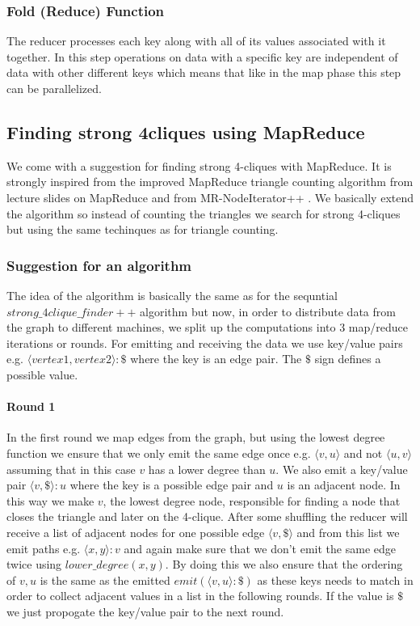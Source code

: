 \documentclass{article}
\begin{document}
\subsubsection{Fold (Reduce) Function}
The reducer processes each key along with all of its values associated with it together. In this step operations on data with a specific key are independent of data with other different keys which means that like in the map phase this step can be parallelized.

\subsection{Finding strong 4cliques using MapReduce}
We come with a suggestion for finding strong 4-cliques with MapReduce. It is strongly inspired from the improved MapReduce triangle counting algorithm from lecture slides on MapReduce \cite{lnMapReduce} and from MR-NodeIterator++ \cite{countingTriangles}. We basically extend the algorithm so instead of counting the triangles we search for strong 4-cliques but using the same techinques as for triangle counting.

\subsubsection{Suggestion for an algorithm}
The idea of the algorithm is basically the same as for the sequntial $strong\_4clique\_finder++$ algorithm but now, in order to distribute data from the graph to different machines, we split up the computations into 3 map/reduce iterations or rounds. For emitting and receiving the data we use key/value pairs e.g. $\langle vertex1,vertex2\rangle :\$$ where the key is an edge pair. The $\$$ sign defines a possible value.

\paragraph{Round 1}
In the first round we map edges from the graph, but using the lowest degree function we ensure that we only emit the same edge once e.g. $\langle v,u\rangle$ and not $\langle u,v\rangle$ assuming that in this case $v$ has a lower degree than $u$. We also emit a key/value pair $\langle v,\$\rangle :u$ where the key is a possible edge pair and $u$ is an adjacent node. In this way we make $v$, the lowest degree node, responsible for finding a node that closes the triangle and later on the 4-clique. After some shuffling the reducer will receive a list of adjacent nodes for one possible edge $\langle v,\$\rangle$ and from this list we emit paths e.g. $\langle x,y\rangle :v$ and again make sure that we don't emit the same edge twice using $lower\_degree(x,y)$. By doing this we also ensure that the ordering of $v,u$ is the same as the emitted $emit(\langle v,u\rangle :\$)$ as these keys needs to match in order to collect adjacent values in a list in the following rounds. If the value is $\$$ we just propogate the key/value pair to the next round.
\end{document}
